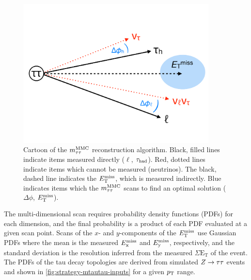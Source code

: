 \begin{figure}[tp]
  \centering
  \includegraphics[width=0.90\textwidth]{figures/mtautau/mmc-cartoon}
  \caption{Cartoon of the $m_{\tau\tau}^\text{MMC}$ reconstruction algorithm. Black, filled lines indicate items measured directly ($\ell$, $\tau_\text{had}$). Red, dotted lines indicate items which cannot be measured (neutrinos). The black, dashed line indicates the $E_{\mathrm{T}}^{\mathrm{miss}}$, which is measured indirectly. Blue indicates items which the $m_{\tau\tau}^\text{MMC}$ scans to find an optimal solution ($\Delta\phi$, $E_{\mathrm{T}}^{\mathrm{miss}}$).}
  \label{fig:strategy-mtautau-cartoon}
\end{figure}

The multi-dimensional scan requires probability density functions (PDFs) for each dimension, and the final probability is a product of each PDF evaluated at a given scan point. Scans of the $x$- and $y$-components of the $E_{\mathrm{T}}^{\mathrm{miss}}$ use Gaussian PDFs where the mean is the measured $E_{\mathrm{x}}^{\mathrm{miss}}$ and $E_{\mathrm{y}}^{\mathrm{miss}}$, respectively, and the standard deviation is the resolution inferred from the measured $\Sigma \text{E}_\text{T}$ of the event. The PDFs of the tau decay topologies are derived from simulated $Z\rightarrow\tau\tau$ events and shown in \cref{fig:strategy-mtautau-inputs} for a given $p_{\mathrm{T}}$ range.

